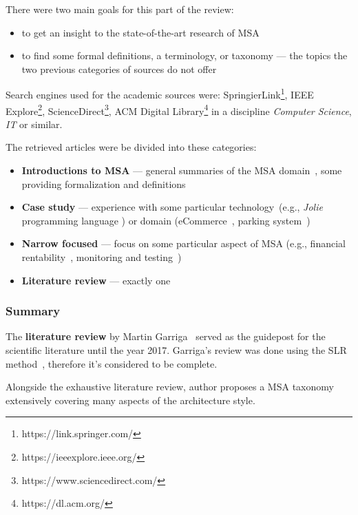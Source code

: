 \documentclass[thesis=M,english,hidelinks]{FITthesis}[2012/10/20]
\begin{document}
There were two main goals for this part of the review:
\begin{itemize}
    \item to get an insight to the state-of-the-art research of \acrshort{MSA}
    \item to find some formal definitions, a terminology, or taxonomy --- the topics the two previous categories of sources do not offer
\end{itemize}

Search engines used for the academic sources were: SpringierLink\footnote{https://link.springer.com/}, IEEE Explore\footnote{https://ieeexplore.ieee.org/},  ScienceDirect\footnote{https://www.sciencedirect.com/}, ACM Digital Library\footnote{https://dl.acm.org/} in a discipline \textit{Computer Science}, \textit{IT} or similar.

\vspace{1em}
\noindent
The retrieved articles were be divided into these categories:
\begin{itemize}
    \item \textbf{Introductions to MSA} --- general summaries of the \acrshort{MSA} domain~\cite{ms-sc-collaborative-mdd, ms-sc-Schwartz2017, ms-sc-Gruhn2018}, some providing formalization and definitions~\cite{ms-today-tomorrow}
    \item \textbf{Case study} --- experience with some particular technology~(e.g., \textit{Jolie} programming language \cite{ms-sc-Guidi2017}) or domain (eCommerce~\cite{ms-sc-ecommerce}, parking system~\cite{ms-sc-parking})
    \item \textbf{Narrow focused} --- focus on some particular aspect of \acrshort{MSA} (e.g., financial rentability~\cite{ms-sc-economics}, monitoring and testing~\cite{ms-sc-visualization})
    \item \textbf{Literature review} --- exactly one~\cite{ms-taxonomy}
\end{itemize}

\subsubsection*{Summary}
The \textbf{literature review} by Martin Garriga~\cite{ms-taxonomy} served as the guidepost for the scientific literature until the year 2017. Garriga's review was done using the \acrfull{SLR} method~\cite{slr-guidelines}, therefore it's considered to be complete.

Alongside the exhaustive literature review, author proposes a \acrshort{MSA} taxonomy extensively covering many aspects of the architecture style.
\end{document}
